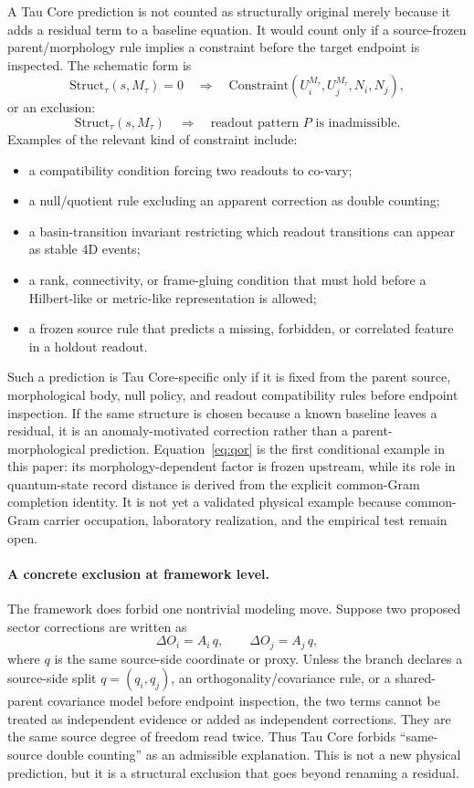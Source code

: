 \documentclass[11pt]{article}
\newcommand{\Mta}{M_{\tau}}
\begin{document}
A Tau Core prediction is not counted as structurally original merely because it
adds a residual term to a baseline equation.  It would count only if a
source-frozen parent/morphology rule implies a constraint before the target
endpoint is inspected.  The schematic form is
\[
  \mathrm{Struct}_{\tau}(s,\Mta)=0
  \quad\Longrightarrow\quad
  \mathrm{Constraint}(U_i^{\Mta},U_j^{\Mta},N_i,N_j),
\]
or an exclusion:
\[
  \mathrm{Struct}_{\tau}(s,\Mta)
  \quad\Longrightarrow\quad
  \text{readout pattern }P\text{ is inadmissible}.
\]
Examples of the relevant kind of constraint include:
\begin{itemize}
  \item a compatibility condition forcing two readouts to co-vary;
  \item a null/quotient rule excluding an apparent correction as double
  counting;
  \item a basin-transition invariant restricting which readout transitions can
  appear as stable 4D events;
  \item a rank, connectivity, or frame-gluing condition that must hold before a
  Hilbert-like or metric-like representation is allowed;
  \item a frozen source rule that predicts a missing, forbidden, or correlated
  feature in a holdout readout.
\end{itemize}

Such a prediction is Tau Core-specific only if it is fixed from the parent
source, morphological body, null policy, and readout compatibility rules
before endpoint inspection.  If the same structure is chosen because a known
baseline leaves a residual, it is an anomaly-motivated correction rather than
a parent-morphological prediction.  Equation~\eqref{eq:qor} is the first
conditional example in this paper: its morphology-dependent factor is frozen
upstream, while its role in quantum-state record distance is derived from the
explicit common-Gram completion identity.  It is not yet a validated physical
example because common-Gram carrier occupation, laboratory realization, and the
empirical test remain open.

\paragraph{A concrete exclusion at framework level.}
The framework does forbid one nontrivial modeling move.  Suppose two proposed
sector corrections are written as
\[
  \Delta O_i=A_i\,q,\qquad \Delta O_j=A_j\,q,
\]
where \(q\) is the same source-side coordinate or proxy.  Unless the branch
declares a source-side split \(q=(q_i,q_j)\), an orthogonality/covariance rule,
or a shared-parent covariance model before endpoint inspection, the two terms
cannot be treated as independent evidence or added as independent corrections.
They are the same source degree of freedom read twice.  Thus Tau Core forbids
``same-source double counting'' as an admissible explanation.  This is not a
new physical prediction, but it is a structural exclusion that goes beyond
renaming a residual.
\end{document}
